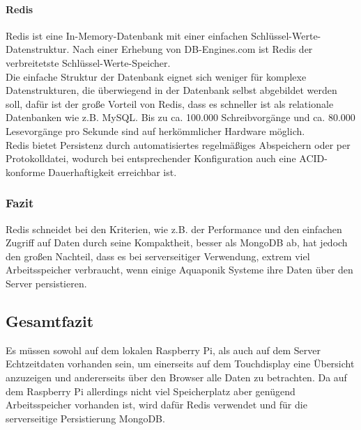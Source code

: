 \documentclass[11pt]{article}
\begin{document}
\paragraph{Redis}
Redis ist eine In-Memory-Datenbank mit einer einfachen Schl\"ussel-Werte-Datenstruktur. Nach einer Erhebung von DB-Engines.com ist Redis der verbreitetste Schl\"ussel-Werte-Speicher.\\
Die einfache Struktur der Datenbank eignet sich weniger f\"ur komplexe Datenstrukturen, die \"uberwiegend in der Datenbank selbst abgebildet werden soll, daf\"ur ist der gro{\ss}e Vorteil von Redis, dass es schneller ist als relationale Datenbanken wie z.B. MySQL. Bis zu ca. 100.000 Schreibvorg\"ange und ca. 80.000 Lesevorg\"ange pro Sekunde sind auf herk\"ommlicher Hardware m\"oglich.\\
Redis bietet Persistenz durch automatisiertes regelm\"a{\ss}iges Abspeichern oder per Protokolldatei, wodurch bei entsprechender Konfiguration auch eine ACID-konforme Dauerhaftigkeit erreichbar ist.

\subsubsection{Fazit}
Redis schneidet bei den Kriterien, wie z.B. der Performance und den einfachen Zugriff auf Daten durch
seine Kompaktheit, besser als MongoDB ab, hat jedoch den gro{\ss}en Nachteil, dass es bei serverseitiger Verwendung, extrem viel Arbeitsspeicher verbraucht, wenn einige Aquaponik Systeme ihre Daten \"uber den Server persistieren.

\subsection{Gesamtfazit}
Es m\"ussen sowohl auf dem lokalen Raspberry Pi, als auch auf dem Server Echtzeitdaten vorhanden sein, um einerseits auf dem Touchdisplay eine \"Ubersicht anzuzeigen und andererseits \"uber den Browser alle Daten zu betrachten. Da auf dem Raspberry Pi allerdings nicht viel Speicherplatz aber genügend Arbeitsspeicher vorhanden ist, wird daf\"ur Redis verwendet und f\"ur die serverseitige Persistierung MongoDB.
\end{document}
